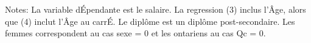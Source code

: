 \begin{table}[H]
\begin{center}
\end{center}                                                                                                                                                                                                                                          
\begin{footnotesize}                                                                                                                                                                                                                                  
\flushleft                                                                                                                                                                                                                                            
Notes: La variable d\'{E}pendante est le salaire. La regression (3) inclus l'\^{A}ge, alors que (4) inclut l'\^{A}ge au carr\'{E}. Le diplôme est un diplôme post-secondaire. Les femmes correspondent au cas sexe = 0 et les ontariens au cas Qc = 0.
\end{footnotesize}                                                                                                                                                                                                                                    
\end{table}                                                                                                                                                                                                                                           
